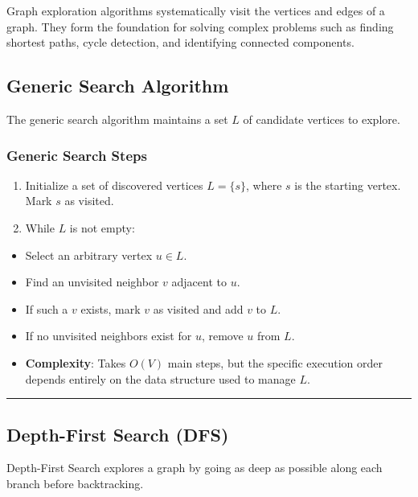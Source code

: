 \documentclass[
]{book}
\theoremstyle{definition}
\theoremstyle{definition}
\theoremstyle{definition}
\theoremstyle{definition}
\theoremstyle{remark}
\begin{document}
Graph exploration algorithms systematically visit the vertices and edges of a graph. They form the foundation for solving complex problems such as finding shortest paths, cycle detection, and identifying connected components.

\subsection{Generic Search Algorithm}\label{generic-search-algorithm}

The generic search algorithm maintains a set \(L\) of candidate vertices to explore.

\subsubsection{Generic Search Steps}\label{generic-search-steps}

\begin{enumerate}
\def\labelenumi{\arabic{enumi}.}
\item
  Initialize a set of discovered vertices \(L = \{s\}\), where \(s\) is the starting vertex. Mark \(s\) as visited.
\item
  While \(L\) is not empty:
\end{enumerate}

\begin{itemize}
\item
  Select an arbitrary vertex \(u \in L\).
\item
  Find an unvisited neighbor \(v\) adjacent to \(u\).
\item
  If such a \(v\) exists, mark \(v\) as visited and add \(v\) to \(L\).
\item
  If no unvisited neighbors exist for \(u\), remove \(u\) from \(L\).
\item
  \textbf{Complexity}: Takes \(O(V)\) main steps, but the specific execution order depends entirely on the data structure used to manage \(L\).
\end{itemize}

\begin{center}\rule{0.5\linewidth}{0.5pt}\end{center}

\subsection{Depth-First Search (DFS)}\label{depth-first-search-dfs}

Depth-First Search explores a graph by going as deep as possible along each branch before backtracking.
\end{document}

